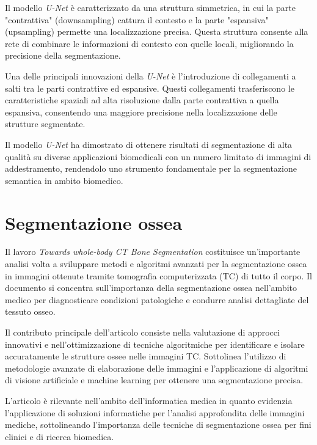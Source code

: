 Il modello \textit{U-Net} è caratterizzato da una struttura simmetrica, in cui
la parte "contrattiva" (downsampling) cattura il contesto e la parte "espansiva"
(upsampling) permette una localizzazione precisa. Questa struttura consente alla
rete di combinare le informazioni di contesto con quelle locali, migliorando la
precisione della segmentazione.

Una delle principali innovazioni della \textit{U-Net} è l'introduzione di
collegamenti a salti tra le parti contrattive ed espansive. Questi collegamenti
trasferiscono le caratteristiche spaziali ad alta risoluzione dalla parte
contrattiva a quella espansiva, consentendo una maggiore precisione nella
localizzazione delle strutture segmentate.

Il modello \textit{U-Net} ha dimostrato di ottenere risultati di segmentazione
di alta qualità su diverse applicazioni biomedicali con un numero limitato di
immagini di addestramento, rendendolo uno strumento fondamentale per la
segmentazione semantica in ambito biomedico.




\section{Segmentazione ossea} \label{sec:segmentazione_ossea}

Il lavoro \textit{Towards whole-body CT Bone Segmentation}
\cite{10.1007/978-3-662-56537-7_59} costituisce un'importante analisi volta a
sviluppare metodi e algoritmi avanzati per la segmentazione ossea in immagini
ottenute tramite tomografia computerizzata (TC) di tutto il corpo. Il documento
si concentra sull'importanza della segmentazione ossea nell'ambito medico per
diagnosticare condizioni patologiche e condurre analisi dettagliate del tessuto
osseo.

Il contributo principale dell'articolo consiste nella valutazione di approcci
innovativi e nell'ottimizzazione di tecniche algoritmiche per identificare e
isolare accuratamente le strutture ossee nelle immagini TC. Sottolinea
l'utilizzo di metodologie avanzate di elaborazione delle immagini e
l'applicazione di algoritmi di visione artificiale e machine learning per
ottenere una segmentazione precisa.

L'articolo è rilevante nell'ambito dell'informatica medica in quanto evidenzia
l'applicazione di soluzioni informatiche per l'analisi approfondita delle
immagini mediche, sottolineando l'importanza delle tecniche di segmentazione
ossea per fini clinici e di ricerca biomedica.


